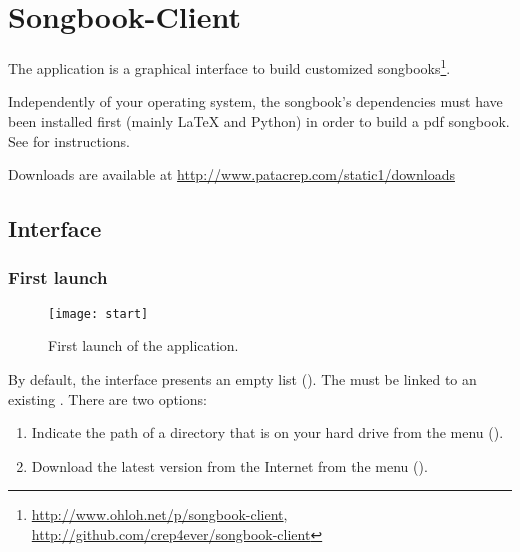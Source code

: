 \chapter{Songbook-Client}
\setcounter{chapter}{2}
\label{chap:songbook-client}
\minitoc

The \client{} application is a graphical interface to build customized
songbooks\footnote{\url{http://www.ohloh.net/p/songbook-client},
  \url{http://github.com/crep4ever/songbook-client}}.

\begin{nota}
Independently of your operating system, the songbook's dependencies must
have been installed first (mainly \LaTeX{} and Python) in order to
build a pdf songbook. See  for instructions.
\end{nota}

Downloads are available at \url{http://www.patacrep.com/static1/downloads}


\section{Interface}

\subsection{First launch}

\begin{figure}
  \centering
  \texttt{[image: start]}
  \caption{First launch of the application.}
  \label{fig:start}
\end{figure}

By default, the interface presents an empty list
(). The \client{} must be linked to an existing
\recueil{}. There are two options:

\begin{enumerate}
\item Indicate the path of a  directory that is on
  your hard drive from the menu 
  ().
\item Download the latest version from the Internet from the menu
   ().
\end{enumerate}

